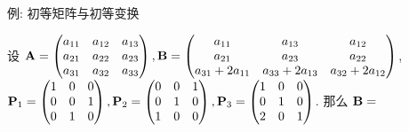 \begin{frame}{例: 初等矩阵与初等变换}
	\onslide<+->
	\begin{example}
		设 ${\mathbf{A}}=\begin{pmatrix}
			a_{11}&a_{12}&a_{13}\\
			a_{21}&a_{22}&a_{23}\\
			a_{31}&a_{32}&a_{33}
		\end{pmatrix},{\mathbf{B}}=\begin{pmatrix}
			a_{11}&a_{13}&a_{12}\\
			a_{21}&a_{23}&a_{22}\\
			a_{31}+2a_{11}&a_{33}+2a_{13}&a_{32}+2a_{12}
		\end{pmatrix}$,\\
		${\mathbf{P}}_1=\begin{pmatrix}
			1&0&0\\0&0&1\\0&1&0
		\end{pmatrix},{\mathbf{P}}_2=\begin{pmatrix}
			0&0&1\\0&1&0\\1&0&0
		\end{pmatrix},{\mathbf{P}}_3=\begin{pmatrix}
			1&0&0\\0&1&0\\2&0&1
		\end{pmatrix}$.
		那么 ${\mathbf{B}}=$
	\end{example}
\end{frame}


